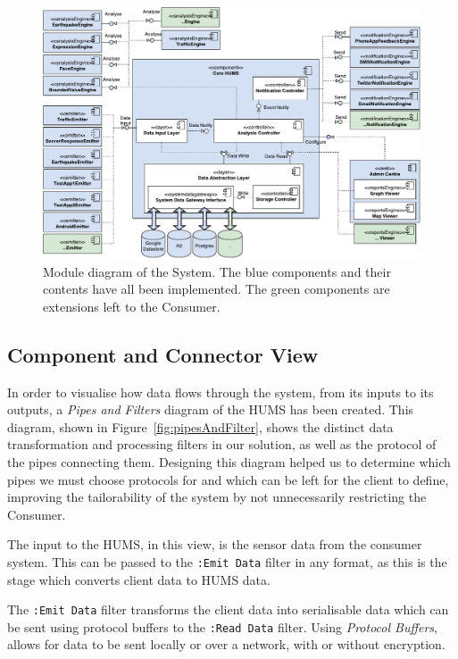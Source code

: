 \documentclass[10pt,a4paper]{article}
\begin{document}

\begin{figure}[tbp]
  \centering
  \includegraphics[width=\textwidth]{images/component.pdf}
  \caption{Module diagram of the System. The blue components and their contents have all been implemented. The green components are extensions left to the Consumer.}
  \label{fig:modules}
\end{figure}

\subsection{Component and Connector View}

In order to visualise how data flows through the system, from its inputs to its outputs, a \emph{Pipes and Filters} diagram of the HUMS has been created. This diagram, shown in Figure~\ref{fig:pipesAndFilter}, shows the distinct data transformation and processing filters in our solution, as well as the protocol of the pipes connecting them. Designing this diagram helped us to determine which pipes we must choose protocols for and which can be left for the client to define, improving the tailorability of the system by not unnecessarily restricting the Consumer.

The input to the HUMS, in this view, is the sensor data from the consumer system. This can be passed to the \texttt{:Emit Data} filter in any format, as this is the stage which converts client data to HUMS data. 

The \texttt{:Emit Data} filter transforms the client data into serialisable data which can be sent using protocol buffers to the \texttt{:Read Data} filter. Using \emph{Protocol Buffers}, allows for data to be sent locally or over a network, with or without encryption. 
\end{document}
